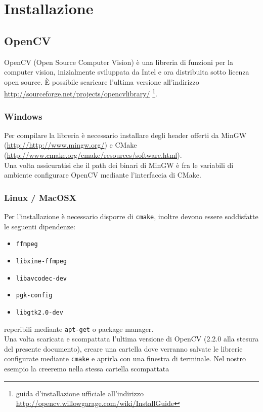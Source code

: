 \documentclass[12pt]{report}
\begin{document}
\chapter{Installazione}
\section{OpenCV}
OpenCV (Open Source Computer Vision) \`e una libreria di funzioni per la computer vision, inizialmente sviluppata da Intel e ora distribuita sotto licenza open source. \`E possibile scaricare l'ultima versione all'indirizzo \url{http://sourceforge.net/projects/opencvlibrary/} \footnote{guida d'installazione ufficiale all'indirizzo \url{http://opencv.willowgarage.com/wiki/InstallGuide}}.

\subsection{Windows}
Per compilare la libreria \`e necessario installare degli header offerti da MinGW (\url{http://http://www.mingw.org/}) e CMake (\url{http://www.cmake.org/cmake/resources/software.html}).\\
\noindent Una volta assicuratisi che il path dei binari di MinGW \`e fra le variabili di ambiente configurare OpenCV mediante l'interfaccia di CMake.

\subsection{Linux / MacOSX}

\noindent Per l'installazione \`e necessario disporre di \verb|cmake|, inoltre devono essere soddisfatte le seguenti dipendenze:
\begin{itemize}
\item \verb|ffmpeg|
\item \verb|libxine-ffmpeg|
\item \verb|libavcodec-dev|
\item \verb|pgk-config|
\item \verb|libgtk2.0-dev|
\end{itemize}

\noindent reperibili mediante \verb|apt-get| o package manager.\\

\noindent Una volta scaricata e scompattata l'ultima versione di OpenCV (2.2.0 alla stesura del presente documento), creare una cartella dove verranno salvate le librerie configurate mediante \verb|cmake| e aprirla con una finestra di terminale. Nel nostro esempio la creeremo nella stessa cartella scompattata
\end{document}
